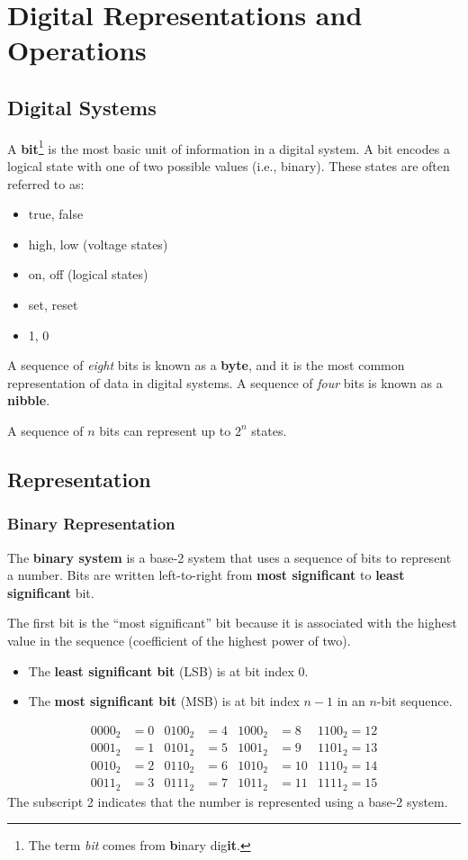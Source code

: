 \documentclass{article}
\begin{document}
\section{Digital Representations and Operations}
\subsection{Digital Systems}
A \textbf{bit}\footnote{The term \textit{bit} comes from \textbf{b}inary dig\textbf{it}.}
is the most basic unit of information in a digital system.
A bit encodes a logical state with one of two possible values (i.e., binary).
These states are often referred to as:
\begin{itemize}
    \item true, false
    \item high, low (voltage states)
    \item on, off (logical states)
    \item set, reset
    \item 1, 0
\end{itemize}
A sequence of \textit{eight} bits is known as a \textbf{byte}, and it is the most
common representation of data in digital systems.
A sequence of \textit{four} bits is known as a \textbf{nibble}.

A sequence of \(n\) bits can represent up to \(2^n\) states.
\subsection{Representation}
\subsubsection{Binary Representation}
The \textbf{binary system} is a base-2 system that uses a sequence of bits to represent a number.
Bits are written left-to-right from \textbf{most significant} to \textbf{least significant} bit.

The first bit is the ``most significant'' bit because it is associated with the highest value in the sequence (coefficient of the highest power of two).
\begin{itemize}
    \item The \textbf{least significant bit} (LSB) is at bit index 0.
    \item The \textbf{most significant bit} (MSB) is at bit index \(n - 1\) in an \(n\)-bit sequence.
\end{itemize}
\begin{align*}
    0000_2 & = 0 & 0100_2 & = 4 & 1000_2 & = 8  & 1100_2 = 12 \\
    0001_2 & = 1 & 0101_2 & = 5 & 1001_2 & = 9  & 1101_2 = 13 \\
    0010_2 & = 2 & 0110_2 & = 6 & 1010_2 & = 10 & 1110_2 = 14 \\
    0011_2 & = 3 & 0111_2 & = 7 & 1011_2 & = 11 & 1111_2 = 15
\end{align*}
The subscript 2 indicates that the number is represented using a base-2 system.
\end{document}
